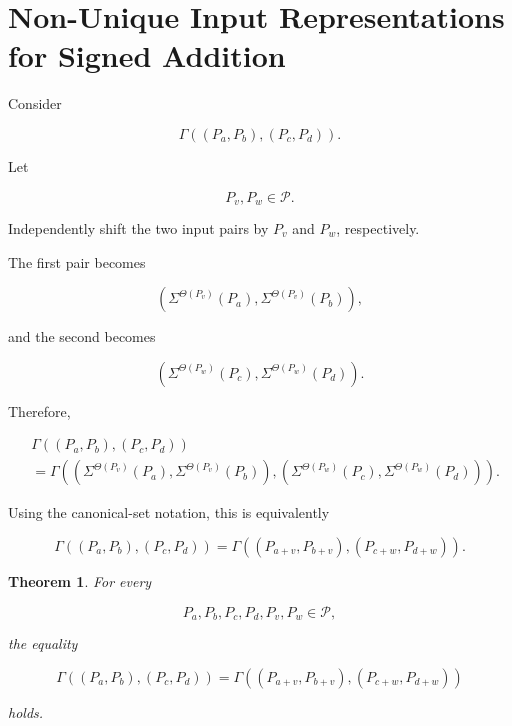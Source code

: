 \documentclass[12pt]{article}
\newtheorem{theorem}{Theorem}
\begin{document}
\section*{Non-Unique Input Representations for Signed Addition}

Consider

\[
\Gamma
\left(
(P_a,P_b),(P_c,P_d)
\right).
\]

Let

\[
P_v,P_w\in\mathcal P.
\]

Independently shift the two input pairs by \(P_v\) and \(P_w\), respectively.

The first pair becomes

\[
\left(
\Sigma^{\Theta(P_v)}(P_a),
\Sigma^{\Theta(P_v)}(P_b)
\right),
\]

and the second becomes

\[
\left(
\Sigma^{\Theta(P_w)}(P_c),
\Sigma^{\Theta(P_w)}(P_d)
\right).
\]

Therefore,

\[
\boxed{
\begin{aligned}
&
\Gamma
\left(
(P_a,P_b),(P_c,P_d)
\right)
\\[4pt]
&=
\Gamma
\left(
\left(
\Sigma^{\Theta(P_v)}(P_a),
\Sigma^{\Theta(P_v)}(P_b)
\right),
\left(
\Sigma^{\Theta(P_w)}(P_c),
\Sigma^{\Theta(P_w)}(P_d)
\right)
\right).
\end{aligned}
}
\]

Using the canonical-set notation, this is equivalently

\[
\boxed{
\Gamma
\left(
(P_a,P_b),(P_c,P_d)
\right)
=
\Gamma
\left(
(P_{a+v},P_{b+v}),
(P_{c+w},P_{d+w})
\right).
}
\]

\begin{theorem}

For every

\[
P_a,P_b,P_c,P_d,P_v,P_w\in\mathcal P,
\]

the equality

\[
\boxed{
\Gamma
\left(
(P_a,P_b),(P_c,P_d)
\right)
=
\Gamma
\left(
(P_{a+v},P_{b+v}),
(P_{c+w},P_{d+w})
\right)
}
\]

holds.

\end{theorem}
\end{document}

